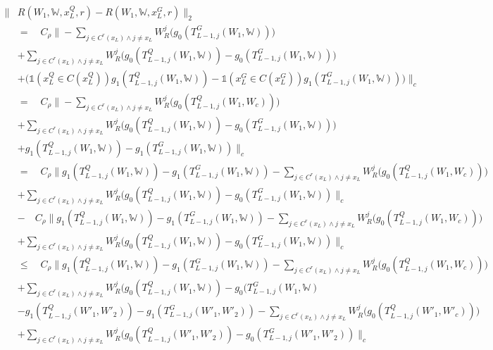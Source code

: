 {{	\begin{equation*}\begin{aligned}
			\|&R(W_1,\mathds{W},x^Q_L,r)-R(W_1,\mathds{W},x^G_L,r)\|_2 \\
			&=\quad C_\rho\bigg\| - \sum_{j\in C^r(x_L)\land j \neq x_L}
			W^j_R\bigg(g_0(T^G_{L-1,j}(W_1,\mathds{W})) \bigg) \\
			&+\sum_{j\in C^r(x_L)\land j \neq x_L}W^j_R\bigg(g_0(T^Q_{L-1,j}(W_1,
			\mathds{W})) -g_0(T^G_{L-1,j}(W_1,\mathds{W}))\bigg) \\
			&+ \bigg(\mathds{1}(x^Q_L\in C(x^Q_L))g_1(T^Q_{L-1,j}(W_1,\mathds{W})) 
			-
			\mathds{1}(x^G_L\in 
			C(x^G_L))g_1(T^G_{L-1,j}(W_1,\mathds{W}))\bigg)\bigg\|_c \\
			&=\quad C_\rho\bigg\|-\sum_{j\in C^r(x_L)\land j \neq x_L}
			W^j_R\bigg(g_0(T^Q_{L-1,j}(W_1,W_c)) \bigg) \\
			&+\sum_{j\in C^r(x_L)\land j \neq x_L}W^j_R\bigg(g_0(T^Q_{L-1,j}(W_1,
			\mathds{W})) -g_0(T^G_{L-1,j}(W_1,\mathds{W}))\bigg) \\
			&+ g_1(T^Q_{L-1,j}(W_1,\mathds{W})) -g_1(T^G_{L-1,j}(W_1,\mathds{W}))
			\bigg\|_c 
			\\
			&=\quad C_\rho\bigg\|g_1(T^Q_{L-1,j}(W_1,\mathds{W})) -g_1(T^G_{L-1,j}
			(W_1,
			\mathds{W}))-\sum_{j\in C^r(x_L)\land j \neq 
				x_L}W^j_R\bigg(g_0(T^Q_{L-1,j}(W_1,W_c)) 
			\bigg) \\
			&+\sum_{j\in C^r(x_L)\land j \neq x_L}W^j_R\bigg(g_0(T^Q_{L-1,j}(W_1,
			\mathds{W})) -g_0(T^G_{L-1,j}(W_1,\mathds{W}))\bigg\|_c \\
			&-\quad C_\rho\bigg\|g_1(T^Q_{L-1,j}(W_1,\mathds{W})) -g_1(T^G_{L-1,j}
			(W_1,
			\mathds{W}))-\sum_{j\in C^r(x_L)\land j \neq 
				x_L}W^j_R\bigg(g_0(T^Q_{L-1,j}(W_1,W_c)) 
			\bigg) \\
			&+\sum_{j\in C^r(x_L)\land j \neq x_L}W^j_R\bigg(g_0(T^Q_{L-1,j}(W_1,
			\mathds{W})) -g_0(T^G_{L-1,j}(W_1,\mathds{W}))\bigg\|_c \\
			&\leq\quad C_\rho\bigg\|g_1(T^Q_{L-1,j}(W_1,\mathds{W})) -g_1(T^G_{L-1,j}(W_1,
			\mathds{W}))-\sum_{j\in C^r(x_L)\land j \neq 
				x_L}W^j_R\bigg(g_0(T^Q_{L-1,j}(W_1,W_c)) 
			\bigg) \\
			&+\sum_{j\in C^r(x_L)\land j \neq x_L}W^j_R\bigg(g_0(T^Q_{L-1,j}(W_1,\mathds{W})) -
			g_0(T^G_{L-1,j}(W_1,\mathds{W}) \\
			&-g_1(T^Q_{L-1,j}(W'_1,W'_2)) -g_1(T^G_{L-1,j}(W'_1,W'_2))-\sum_{j\in C^r(x_L)\land j \neq 
				x_L}W^j_R\bigg(g_0(T^Q_{L-1,j}(W'_1,W'_c)) \bigg) \\
			&+\sum_{j\in C^r(x_L)\land j \neq x_L}W^j_R\bigg(g_0(T^Q_{L-1,j}(W'_1,W'_2)) -
			g_0(T^G_{L-1,j}(W'_1,W'_2))\bigg\|_c \\
	\end{aligned}\end{equation*}
	
}}
